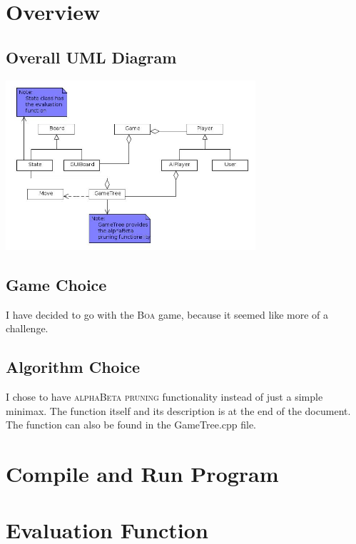\documentclass[a4paper]{article}
\begin{document}

\tableofcontents
\newpage

\section{Overview}
	\subsection{Overall UML Diagram}
		\begin{center}
			\includegraphics[width=350px]{fullUML.jpg}	
		\end{center}
	
	\subsection{Game Choice}
	I have decided to go with the \textsc{\LARGE Boa} game, because it seemed like more of a challenge.
	\subsection{Algorithm Choice}
	I chose to have \textsc{\LARGE alphaBeta pruning} functionality instead of just a simple minimax. The function itself and its 
	description is at the end of the document. The function can also be found in the GameTree.cpp file.
\section{Compile and Run Program}
\section{Evaluation Function}
\end{document}
